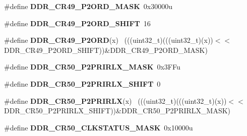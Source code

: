 \begin{DoxyCompactItemize}
\item 
\hypertarget{group___d_d_r___register___masks_ga0a36cea2b045d06719872b145340cec3}{}\#define {\bfseries D\+D\+R\+\_\+\+C\+R49\+\_\+\+P2\+O\+R\+D\+\_\+\+M\+A\+S\+K}~0x30000u\label{group___d_d_r___register___masks_ga0a36cea2b045d06719872b145340cec3}

\item 
\hypertarget{group___d_d_r___register___masks_gac92841f5d65cb2f53ebc526e87dd212b}{}\#define {\bfseries D\+D\+R\+\_\+\+C\+R49\+\_\+\+P2\+O\+R\+D\+\_\+\+S\+H\+I\+F\+T}~16\label{group___d_d_r___register___masks_gac92841f5d65cb2f53ebc526e87dd212b}

\item 
\hypertarget{group___d_d_r___register___masks_ga5222828cdae396a1986fa8d38fedb500}{}\#define {\bfseries D\+D\+R\+\_\+\+C\+R49\+\_\+\+P2\+O\+R\+D}(x)                                            ~(((uint32\+\_\+t)(((uint32\+\_\+t)(x))$<$$<$D\+D\+R\+\_\+\+C\+R49\+\_\+\+P2\+O\+R\+D\+\_\+\+S\+H\+I\+F\+T))\&D\+D\+R\+\_\+\+C\+R49\+\_\+\+P2\+O\+R\+D\+\_\+\+M\+A\+S\+K)\label{group___d_d_r___register___masks_ga5222828cdae396a1986fa8d38fedb500}

\item 
\hypertarget{group___d_d_r___register___masks_gae24d6c3fa1b13a70bbb39d7a2f0bc43d}{}\#define {\bfseries D\+D\+R\+\_\+\+C\+R50\+\_\+\+P2\+P\+R\+I\+R\+L\+X\+\_\+\+M\+A\+S\+K}~0x3\+F\+Fu\label{group___d_d_r___register___masks_gae24d6c3fa1b13a70bbb39d7a2f0bc43d}

\item 
\hypertarget{group___d_d_r___register___masks_ga7536cbfd9397b2bc0440fa98b6aa88d7}{}\#define {\bfseries D\+D\+R\+\_\+\+C\+R50\+\_\+\+P2\+P\+R\+I\+R\+L\+X\+\_\+\+S\+H\+I\+F\+T}~0\label{group___d_d_r___register___masks_ga7536cbfd9397b2bc0440fa98b6aa88d7}

\item 
\hypertarget{group___d_d_r___register___masks_gab99e4623d9174e9d4a85d4528bf87abc}{}\#define {\bfseries D\+D\+R\+\_\+\+C\+R50\+\_\+\+P2\+P\+R\+I\+R\+L\+X}(x)                                      ~(((uint32\+\_\+t)(((uint32\+\_\+t)(x))$<$$<$D\+D\+R\+\_\+\+C\+R50\+\_\+\+P2\+P\+R\+I\+R\+L\+X\+\_\+\+S\+H\+I\+F\+T))\&D\+D\+R\+\_\+\+C\+R50\+\_\+\+P2\+P\+R\+I\+R\+L\+X\+\_\+\+M\+A\+S\+K)\label{group___d_d_r___register___masks_gab99e4623d9174e9d4a85d4528bf87abc}

\item 
\hypertarget{group___d_d_r___register___masks_gaad13fba43f7cb8ce5748fb1f022a5df5}{}\#define {\bfseries D\+D\+R\+\_\+\+C\+R50\+\_\+\+C\+L\+K\+S\+T\+A\+T\+U\+S\+\_\+\+M\+A\+S\+K}~0x10000u\label{group___d_d_r___register___masks_gaad13fba43f7cb8ce5748fb1f022a5df5}


\end{DoxyCompactItemize}
